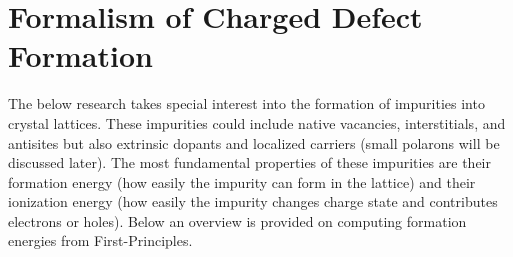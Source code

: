 \section{Formalism of Charged Defect Formation}

The below research takes special interest into the formation of impurities into crystal lattices. These impurities could include native vacancies, interstitials, and antisites but also extrinsic dopants and localized carriers (small polarons will be discussed later).
The most fundamental properties of these impurities are their formation energy (how easily the impurity can form in the lattice) and their ionization energy (how easily the impurity changes charge state and contributes electrons or holes).
Below an overview is provided on computing formation energies from First-Principles.

